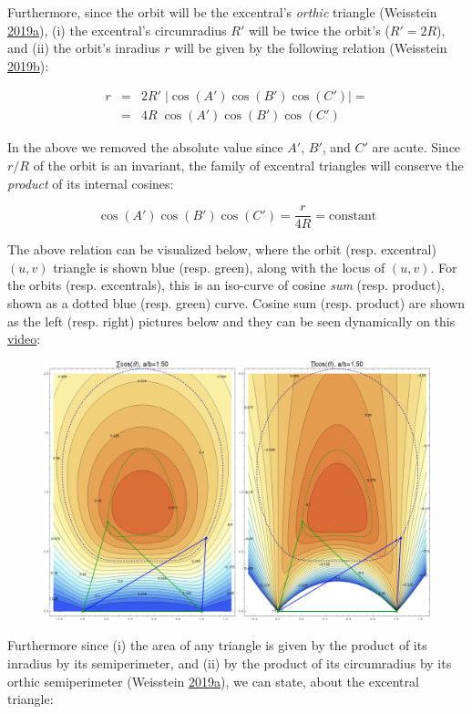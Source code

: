 \documentclass[]{article}
\begin{document}
Furthermore, since the orbit will be the excentral's \emph{orthic} triangle (Weisstein \protect\hyperlink{ref-mw}{2019}\protect\hyperlink{ref-mw}{a}), (i) the excentral's circumradius \(R'\) will be twice the orbit's (\(R'=2R\)), and (ii) the orbit's inradius \(r\) will be given by the following relation (Weisstein \protect\hyperlink{ref-mw_orthic}{2019}\protect\hyperlink{ref-mw_orthic}{b}):

\[
\begin{array}{rcl}
r  & = & 2 R'\;|\cos(A')\cos(B')\cos(C')| = \\
  & = & 4 R\;\cos(A')\cos(B')\cos(C')
\end{array}
\]

In the above we removed the absolute value since \(A'\), \(B'\), and \(C'\) are acute. Since \(r/R\) of the orbit is an invariant, the family of excentral triangles will conserve the \emph{product} of its internal cosines:

\[
\cos(A')\cos(B')\cos(C') = \frac{r}{4R} = \text{constant}
\]

The above relation can be visualized below, where the orbit (resp. excentral) \((u,v)\) triangle is shown blue (resp. green), along with the locus of \((u,v)\). For the orbits (resp. excentrals), this is an iso-curve of cosine \emph{sum} (resp. product), shown as a dotted blue (resp. green) curve. Cosine sum (resp. product) are shown as the left (resp. right) pictures below and they can be seen dynamically on this \href{https://youtu.be/P8ykpE_ZbZ8}{video}:

\begin{figure}[H]

{\centering \includegraphics[width=0.75\linewidth]{pics/uv_arm_sum_prod} 

}

\end{figure}

Furthermore since (i) the area of any triangle is given by the product of its inradius by its semiperimeter, and (ii) by the product of its circumradius by its orthic semiperimeter (Weisstein \protect\hyperlink{ref-mw}{2019}\protect\hyperlink{ref-mw}{a}), we can state, about the excentral triangle:
\end{document}
